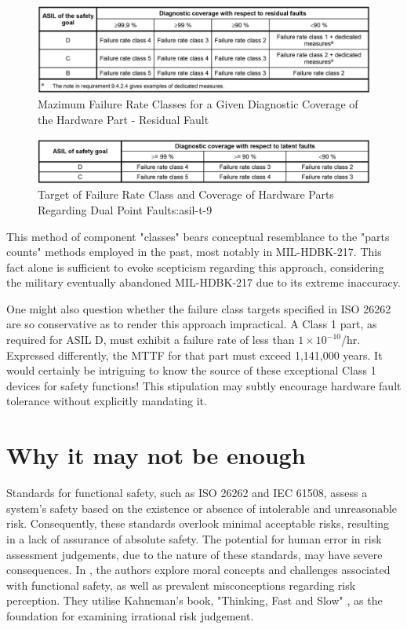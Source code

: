 \documentclass[./dissertation.tex]{subfiles}
\begin{document}
\begin{figure}[H]
\centering
\includegraphics[width=\linewidth]{subfiles/imgs/asil-t-8.png}
\caption{Mazimum Failure Rate Classes for a Given Diagnostic Coverage of the Hardware Part - Residual Fault}
\label{fig:asil-t-8}
\end{figure}

\begin{figure}[H]
\centering
\includegraphics[width=\linewidth]{subfiles/imgs/asil-t-9.png}
\caption{Target of Failure Rate Class and Coverage of Hardware Parts Regarding Dual Point Faults:asil-t-9}
\end{figure}

This method of component "classes" bears conceptual resemblance to the "parts counts" methods employed in the past, most notably in MIL-HDBK-217. This fact alone is sufficient to evoke scepticism regarding this approach, considering the military eventually abandoned MIL-HDBK-217 due to its extreme inaccuracy.

One might also question whether the failure class targets specified in ISO 26262 are so conservative as to render this approach impractical. A Class 1 part, as required for ASIL D, must exhibit a failure rate of less than $1\times10^{-10}$/hr. Expressed differently, the MTTF for that part must exceed 1,141,000 years. It would certainly be intriguing to know the source of these exceptional Class 1 devices for safety functions! This stipulation may subtly encourage hardware fault tolerance without explicitly mandating it.



\section{Why it may not be enough}
Standards for functional safety, such as ISO 26262 and IEC 61508, assess a system's safety based on the existence or absence of intolerable and unreasonable risk. Consequently, these standards overlook minimal acceptable risks, resulting in a lack of assurance of absolute safety. The potential for human error in risk assessment judgements, due to the nature of these standards, may have severe consequences. In \cite{7958474}, the authors explore moral concepts and challenges associated with functional safety, as well as prevalent misconceptions regarding risk perception. They utilise Kahneman's book, "Thinking, Fast and Slow" \cite{daniel2017thinking}, as the foundation for examining irrational risk judgement.
\end{document}
